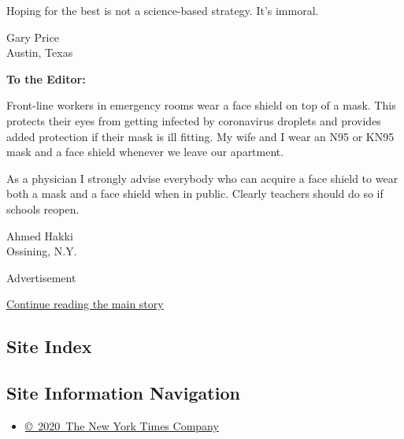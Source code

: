 Hoping for the best is not a science-based strategy. It's immoral.

Gary Price\\
Austin, Texas

\textbf{To the Editor:}

Front-line workers in emergency rooms wear a face shield on top of a
mask. This protects their eyes from getting infected by coronavirus
droplets and provides added protection if their mask is ill fitting. My
wife and I wear an N95 or KN95 mask and a face shield whenever we leave
our apartment.

As a physician I strongly advise everybody who can acquire a face shield
to wear both a mask and a face shield when in public. Clearly teachers
should do so if schools reopen.

Ahmed Hakki\\
Ossining, N.Y.

Advertisement

\protect\hyperlink{after-bottom}{Continue reading the main story}

\hypertarget{site-index}{%
\subsection{Site Index}\label{site-index}}

\hypertarget{site-information-navigation}{%
\subsection{Site Information
Navigation}\label{site-information-navigation}}

\begin{itemize}
\tightlist
\item
  \href{https://help.nytimes.com/hc/en-us/articles/115014792127-Copyright-notice}{©~2020~The
  New York Times Company}
\end{itemize}

